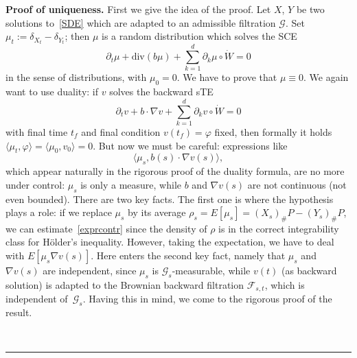 \documentclass[a4paper,10pt]{article}
\newenvironment{proof}[1][Proof]{\noindent\textbf{#1.} }{\ \rule{0.5em}{0.5em}}
\newcommand{\mc}{\mathcal}
\newcommand{\lan}{\langle}
\newcommand{\ran}{\rangle}
\newcommand{\diverg}{\mathrm{div}}
\begin{document}
\begin{proof}[Proof of uniqueness]
First we give the idea of the proof. Let $X$, $Y$ be two solutions to~\eqref{SDE} which are adapted to an admissible filtration $\mc{G}$. Set $\mu_t:=\delta_{X_t}-\delta_{Y_t}$; then $\mu$ is a random distribution which solves the SCE
\begin{equation}
\partial_t\mu+\diverg(b\mu)+\sum^d_{k=1}\partial_k\mu\circ\dot{W}=0\label{sCE}
\end{equation}
in the sense of distributions, with $\mu_0=0$. We have to prove that $\mu\equiv0$. We again want to use duality: if $v$ solves the backward sTE
\begin{equation*}
\partial_t v +b\cdot\nabla v +\sum^d_{k=1}\partial_kv\circ\dot{W} =0
\end{equation*}
with final time $t_f$ and final condition $v(t_f)=\varphi$ fixed, then formally it holds $\lan \mu_t,\varphi\ran= \lan \mu_0,v_0\ran =0$. But now we must be careful: expressions like
\begin{equation}
\lan \mu_s,b(s) \cdot\nabla v(s)\ran,\label{exprcontr}
\end{equation}
which appear naturally in the rigorous proof of the duality formula, are no more under control: $\mu_s$ is only a measure, while $b$ and $\nabla v(s)$ are not continuous (not even bounded). There are two key facts. The first one is where the hypothesis plays a role: if we replace $\mu_s$ by its average $\rho_s=E[\mu_s]=(X_s)_\#P-(Y_s)_\#P$, we can estimate~\eqref{exprcontr} since the density of $\rho$ is in the correct integrability class for H\"older's inequality. However, taking the expectation, we have to deal with $E[\mu_s\nabla v(s)]$. Here enters the second key fact, namely that $\mu_s$ and $\nabla v(s)$ are independent, since $\mu_s$ is $\mc{G}_s$-measurable, while $v(t)$ (as backward solution) is adapted to the Brownian backward filtration $\mc{F}_{s,t}$, which is independent of~$\mc{G}_s$. Having this in mind, we come to the rigorous proof of the result.


\end{proof}
\end{document}
